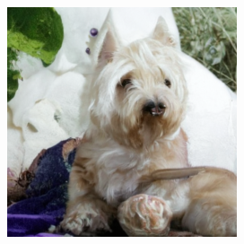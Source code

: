 \documentclass{article}
\begin{document}
\begin{figure}
\begin{subfigure}[b]{0.19\linewidth}
    \end{subfigure}
    \begin{subfigure}[b]{0.19\linewidth}
    \includegraphics[width=\linewidth]{figures/imagenet256/solver_samples/imagenet256_fm_ot_08_50.png}
    \end{subfigure}\\
    

\end{figure}
\end{document}
